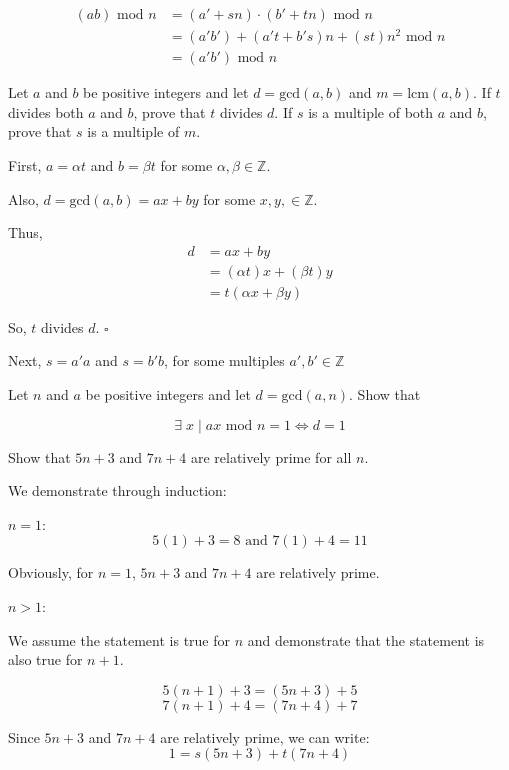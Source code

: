 \documentclass[11pt,largemargins]{homework}
\begin{document}
\begin{align*}
    (a b)\text{ mod }n &= (a'+sn) \cdot (b'+tn) \text{ mod }n\\
                       &= (a'b') + (a't + b's)n + (st)n^2\text{ mod }n\\
                       &= (a'b')\text{ mod }n 
\end{align*}

\question 
Let $a$ and $b$ be positive integers and let $d = \text{gcd}(a,b)$ and $m = \text{lcm}(a,b)$. If $t$ divides both $a$ and $b$, 
prove that $t$ divides $d$. If $s$ is a multiple of both $a$ and $b$, prove that $s$ is a multiple of $m$. 

\quad First, $a=\alpha t$ and $b=\beta t$ for some $\alpha, \beta \in\mathbb{Z}$.

\quad Also, $d=\text{gcd}(a,b)=ax+by$ for some $x, y, \in\mathbb{Z}$.

\quad Thus,
\begin{align*}
    d &= ax+by\\
      &= (\alpha t)x+(\beta t)y\\
      &= t(\alpha x + \beta y)
\end{align*}

\quad So, $t$ divides $d$. $\square$

\hfill

\quad Next, $s = a'a$ and $s = b'b$, for some multiples $a', b' \in\mathbb{Z}$


\question 
Let $n$ and $a$ be positive integers and let $d=\text{gcd}(a,n)$. Show that  

\begin{equation}\tag{0.13}
    \exists \; x \; | \; ax\text{ mod }n=1 \iff d=1
\end{equation}

\question 
Show that $5n+3$ and $7n+4$ are relatively prime for all $n$.

\quad We demonstrate through induction:

\quad $n=1$:
$$5(1)+3=8\text{ and } 7(1)+4=11$$

\quad Obviously, for $n=1$, $5n+3$ and $7n+4$ are relatively prime.

\quad $n>1$:

\quad We assume the statement is true for $n$ and demonstrate that the statement is also true for $n+1$.

$$5(n+1)+3 = (5n+3)+5$$
$$7(n+1)+4 = (7n+4)+7$$

\quad Since $5n+3$ and $7n+4$ are relatively prime, we can write:
$$1 = s(5n+3)+t(7n+4)$$
\end{document}
